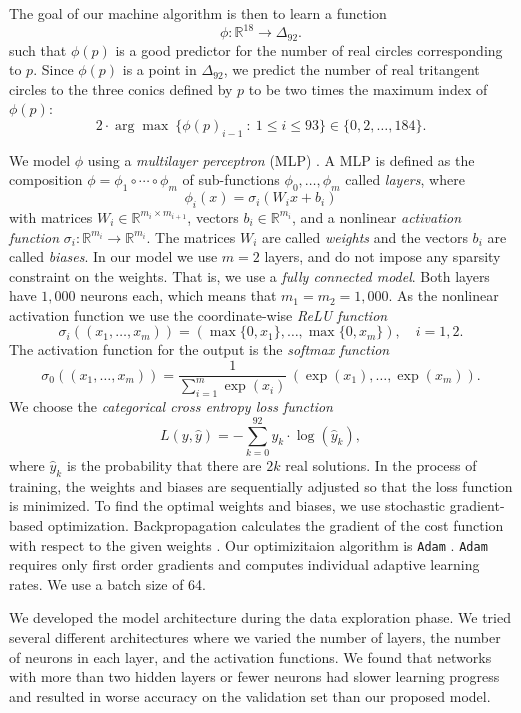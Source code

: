 \documentclass[12pt]{amsart}
\theoremstyle{definition}
\theoremstyle{definition}
\numberwithin{equation}{section}
\begin{document}
The goal of our machine algorithm is then to learn a function 
$$\phi: \mathbb R^{18} \to \Delta_{92}.$$
such that $\phi(p)$ is a good predictor for the number of real circles corresponding to $p$. Since $\phi(p)$ is a point in $\Delta_{92}$, we predict the number of real tritangent circles to the three conics defined by $p$ to be two times the maximum index of $\phi(p)$:
\[ 2 \cdot \arg\max \ \{ \phi(p)_{i-1} \ : \ 1 \leq i \leq 93\} \in \{0,2,\ldots,184\}.\]


We model $\phi$ using a \emph{multilayer perceptron} (MLP) \cite{HORNIK1991251}. A MLP is defined as the composition $\phi = \phi_1\circ\cdots\circ\phi_m$ of sub-functions $\phi_0,\ldots,\phi_m$ called \emph{layers}, where 
$$\phi_i(x) = \sigma_i(W_ix+b_i)$$
with matrices $W_{i}\in\mathbb R^{m_{i}\times m_{i+1}}$, vectors $b_i\in\mathbb R^{m_i}$, and a nonlinear \emph{activation function} $\sigma_i: \mathbb R^{m_i}\to\mathbb R^{m_{i}}$. The matrices $W_i$ are called \emph{weights} and the vectors $b_i$ are called \emph{biases}. In our model we use $m=2$ layers, and do not impose any sparsity constraint on the weights. That is, we use a \emph{fully connected model}. Both layers have $1,000$ neurons each, which means that $m_1=m_2=1,000$. As the nonlinear activation function we use the coordinate-wise \emph{ReLU function}  
$$\sigma_i((x_1,\ldots,x_m)) = (\max\{0,x_1\},\ldots, \max\{0,x_m\}),\quad i=1,2.$$ 
The activation function for the output is the
\emph{softmax function} 
$$\sigma_0((x_1,\ldots,x_m))=\frac{1}{\sum_{i=1}^m \exp(x_i)}\, (\exp(x_1),\ldots,\exp(x_m)).$$
We choose the \emph{categorical cross entropy loss function}
$$L(y, \hat y) = -\sum_{k=0}^{92} y_k\cdot\log(\hat y_k),$$
where $\hat y_k$ is the probability that there are $2k$ real solutions. In the process of training, the weights and biases are sequentially adjusted so that the loss function is minimized. 
To find the optimal weights and biases, we use stochastic gradient-based optimization.
Backpropagation calculates the gradient of the cost function with respect to the given weights \cite{Goodfellow-et-al-2016}. Our optimizitaion algorithm is \texttt{Adam} \cite{Adam}. \texttt{Adam} requires only first order gradients and computes individual adaptive learning rates. 
We use a batch size of 64. 


We developed the model architecture during the data exploration phase. We tried several different architectures where we varied the number of layers, the number of neurons in each layer, and the activation functions. We found that networks with more than two hidden layers or fewer neurons had slower learning progress and resulted in worse accuracy on the validation set than our proposed model. 
\end{document}

